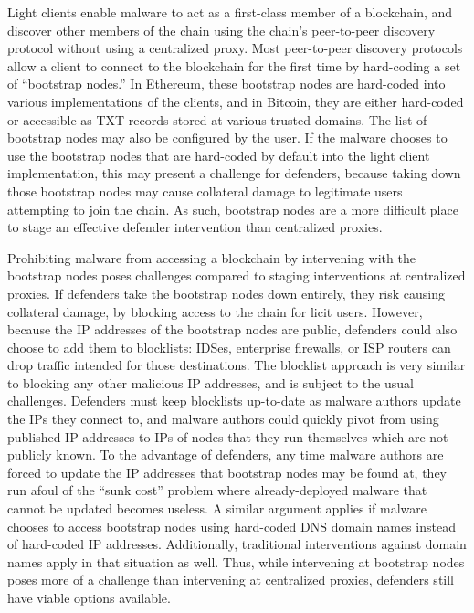 \documentclass[10pt,sigconf,letterpaper]{acmart}
\begin{document}
Light clients enable malware to act as a first-class member 
of a blockchain, and discover other members of the chain 
using the chain's peer-to-peer discovery protocol without 
using a centralized proxy. Most peer-to-peer discovery 
protocols allow a client to connect to the blockchain for the 
first time by hard-coding a set of ``bootstrap nodes.'' In 
Ethereum, these bootstrap nodes are hard-coded into various 
implementations of the clients, and in Bitcoin, they are 
either hard-coded or accessible as TXT records stored at 
various trusted domains. The list of bootstrap nodes may also 
be configured by the user. If the 
malware chooses to use the bootstrap nodes that are 
hard-coded by default into the light client implementation, 
this may present a challenge for defenders, because taking 
down those bootstrap nodes may cause collateral damage to 
legitimate users attempting to join the chain. As such, 
bootstrap nodes are a more difficult place to stage an 
effective defender intervention than centralized proxies. 

Prohibiting malware from accessing a blockchain by intervening with the 
bootstrap nodes poses challenges compared to staging interventions at centralized proxies. If 
defenders take the bootstrap nodes down entirely, they risk causing collateral damage, by blocking 
access to the chain for licit users. However, because the IP addresses of the bootstrap nodes are 
public, defenders could also choose to add them to blocklists: IDSes, enterprise firewalls, or ISP 
routers can drop traffic intended for those destinations. The blocklist approach is very similar to 
blocking any other malicious IP addresses, and is subject to the usual challenges. Defenders must 
keep blocklists up-to-date as malware authors update the IPs they connect to, and malware authors 
could quickly pivot from using published IP addresses to IPs of nodes that they run 
themselves which are not publicly known. To the advantage of defenders, any time malware authors 
are forced to update the IP addresses that bootstrap nodes may be found at, they run 
afoul of the ``sunk cost'' problem where already-deployed malware that cannot be updated becomes 
useless. A similar argument applies if malware chooses to access bootstrap nodes using hard-coded 
DNS domain names instead of hard-coded IP addresses. Additionally, traditional interventions 
against domain names apply in that situation as well. Thus, while intervening at bootstrap nodes 
poses more of a challenge than intervening at centralized proxies, defenders still have viable 
options available.
\end{document}
